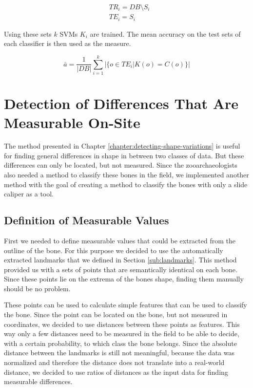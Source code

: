 \documentclass[pdftex,12pt,a4paper]{report}
\begin{document}
\begin{equation}
\begin{split}
& TR_i = DB \setminus S_i \\
& TE_i = S_i 
\end{split}
\end{equation}

Using these sets $k$ SVMs $K_i$ are trained. The mean accuracy on the test sets of each classifier is then used
as the measure.

\begin{equation}
\bar{a} = \frac{1}{|DB|} \sum_{i=1}^k | \{o \in TE_i | K(o) = C(o) \}| 
\end{equation}



\chapter{Detection of Differences That Are Measurable On-Site}
\label{chapter:measurable-differences}

The method presented in Chapter \ref{chapter:detecting-shape-variations} is useful for finding general differences in shape in between two classes of data. But these differences can only be located, but not measured. Since the zooarchaeologists also needed a method to classify these bones in the field, we implemented another method with the goal of creating a method to classify the bones with only a slide caliper as a tool.

\section{Definition of Measurable Values}

First we needed to define measurable values that could be extracted from the outline of the bone. For this purpose we decided to use the automatically extracted landmarks that we defined in Section \ref{sub:landmarks}. This method provided us with a sets of points that are semantically identical on each bone. Since these points lie on the extrema of the bones shape, finding them manually should be no problem.

These points can be used to calculate simple features that can be used to classify the bone. Since the point can be located on the bone, but not measured in coordinates, we decided to use distances between these points as features. This way only a few distances need to be measured in the field to be able to decide, with a certain probability, to which class the bone belongs. Since the absolute distance between the landmarks is still not meaningful, because the data was normalized and therefore the distance does not translate into a real-world distance, we decided to use ratios of distances as the input data for finding measurable differences.
\end{document}
